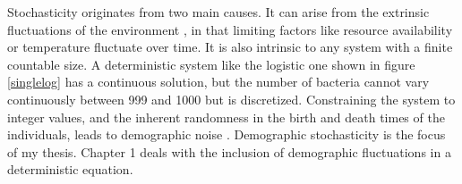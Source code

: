 Stochasticity originates from two main causes. 
It can arise from the extrinsic fluctuations of the environment \cite{Kamenev2008a,Chotibut2017b}, in that limiting factors like resource availability or temperature fluctuate over time. 
It is also intrinsic to any system with a finite countable size. 
A deterministic system like the logistic one shown in figure \ref{singlelog} has a continuous solution, but the number of bacteria cannot vary continuously between 999 and 1000 but is discretized. 
Constraining the system to integer values, and the inherent randomness in the birth and death times of the individuals, leads to demographic noise \cite{Assaf2006,Gottesman2012,Dobrinevski2012,Gabel2013,Fisher2014,Constable2015,Lin2012,Chotibut2015,Young2018}. 
Demographic stochasticity is the focus of my thesis. 
Chapter 1 deals with the inclusion of demographic fluctuations in a deterministic equation. %

